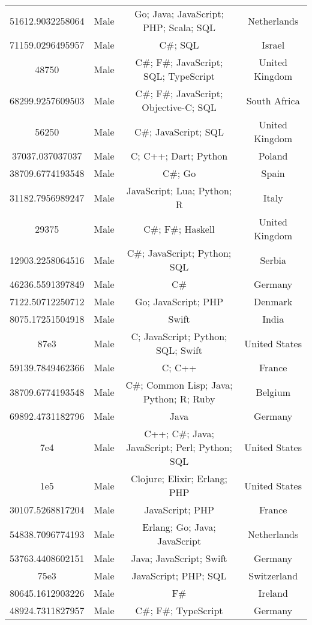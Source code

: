 \begin{center}
\begin{tabular}{ |c|c|c|c| }
51612.9032258064  &  Male  &  Go; Java; JavaScript; PHP; Scala; SQL  &  Netherlands  \\ 
71159.0296495957  &  Male  &  C\#; SQL  &  Israel  \\ 
48750  &  Male  &  C\#; F\#; JavaScript; SQL; TypeScript  &  United Kingdom  \\ 
68299.9257609503  &  Male  &  C\#; F\#; JavaScript; Objective-C; SQL  &  South Africa  \\ 
56250  &  Male  &  C\#; JavaScript; SQL  &  United Kingdom  \\ 
37037.037037037  &  Male  &  C; C++; Dart; Python  &  Poland  \\ 
38709.6774193548  &  Male  &  C\#; Go  &  Spain  \\ 
31182.7956989247  &  Male  &  JavaScript; Lua; Python; R  &  Italy  \\ 
29375  &  Male  &  C\#; F\#; Haskell  &  United Kingdom  \\ 
12903.2258064516  &  Male  &  C\#; JavaScript; Python; SQL  &  Serbia  \\ 
46236.5591397849  &  Male  &  C\#  &  Germany  \\ 
7122.50712250712  &  Male  &  Go; JavaScript; PHP  &  Denmark  \\ 
8075.17251504918  &  Male  &  Swift  &  India  \\ 
87e3  &  Male  &  C; JavaScript; Python; SQL; Swift  &  United States  \\ 
59139.7849462366  &  Male  &  C; C++  &  France  \\ 
38709.6774193548  &  Male  &  C\#; Common Lisp; Java; Python; R; Ruby  &  Belgium  \\ 
69892.4731182796  &  Male  &  Java  &  Germany  \\ 
7e4  &  Male  &  C++; C\#; Java; JavaScript; Perl; Python; SQL  &  United States  \\ 
1e5  &  Male  &  Clojure; Elixir; Erlang; PHP  &  United States  \\ 
30107.5268817204  &  Male  &  JavaScript; PHP  &  France  \\ 
54838.7096774193  &  Male  &  Erlang; Go; Java; JavaScript  &  Netherlands  \\ 
53763.4408602151  &  Male  &  Java; JavaScript; Swift  &  Germany  \\ 
75e3  &  Male  &  JavaScript; PHP; SQL  &  Switzerland  \\ 
80645.1612903226  &  Male  &  F\#  &  Ireland  \\ 
48924.7311827957  &  Male  &  C\#; F\#; TypeScript  &  Germany  \\ 

\end{tabular}
\end{center}
